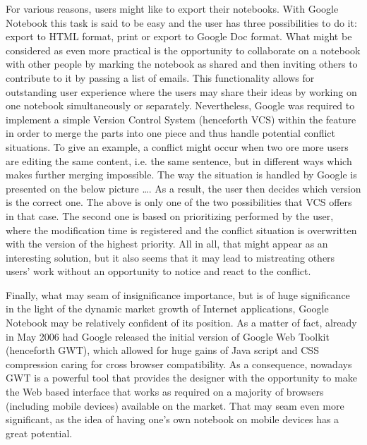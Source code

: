 For various reasons, users might like to export their notebooks. With Google Notebook this task is said to be easy and the user has three possibilities to do it: export to HTML format, print or export to Google Doc format. What might be considered as even more practical is the opportunity to collaborate on a notebook with other people by marking the notebook as shared and then inviting others to contribute to it by passing a list of emails. This functionality allows for outstanding user experience where the users may share their ideas by working on one notebook simultaneously or separately. Nevertheless, Google was required to implement a simple Version Control System (henceforth VCS) within the feature in order to merge the parts into one piece and thus handle potential conflict situations. To give an example, a conflict might occur when two ore more users are editing the same content, i.e. the same sentence, but in different ways which makes further merging impossible. The way the situation is handled by Google is presented on the below picture \dots. As a result, the user then decides which version is the correct one. The above is only one of the two possibilities that VCS offers in that case. The second one is based on prioritizing performed by the user, where the modification time is registered and the conflict situation is overwritten with the version of the highest priority. All in all, that might appear as an interesting solution, but it also seems that it may lead to mistreating others users' work without an opportunity to notice and react to the conflict.

Finally, what may seam of insignificance importance, but is of huge significance in the light of the dynamic market growth of Internet applications, Google Notebook may be relatively confident of its position. As a matter of fact, already in May 2006 had Google released the initial version of Google Web Toolkit (henceforth GWT), which allowed for huge gains of Java script and CSS compression caring for cross browser compatibility. As a consequence, nowadays GWT is a powerful tool that provides the designer with the opportunity to make the Web based interface that works as required on a majority of browsers (including mobile devices) available on the market. That may seam even more significant, as the idea of having one's own notebook on mobile devices has a great potential. 


